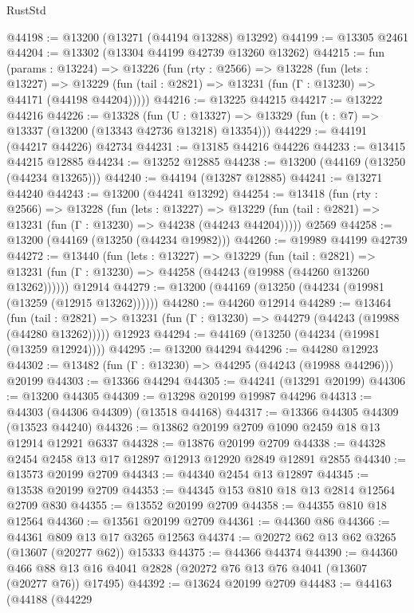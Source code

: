 \begin{lexlean}{RustStd}
\begin{coremodule}
@44198 := @13200 (@13271 (@44194 @13288) @13292)
@44199 := @13305 @2461
@44204 := @13302 (@13304 @44199 @42739 @13260 @13262)
@44215 := fun (params : @13224) =>
  @13226
    (fun (rty : @2566) =>
    @13228
      (fun (lets : @13227) =>
      @13229 (fun (tail : @2821) => @13231 (fun (Γ : @13230) => @44171 (@44198 @44204)))))
@44216 := @13225 @44215
@44217 := @13222 @44216
@44226 := @13328
    (fun (U : @13327) => @13329 (fun (t : @7) => @13337 (@13200 (@13343 @42736 @13218) @13354)))
@44229 := @44191 (@44217 @44226) @42734
@44231 := @13185 @44216 @44226
@44233 := @13415 @44215 @12885
@44234 := @13252 @12885
@44238 := @13200 (@44169 (@13250 (@44234 @13265)))
@44240 := @44194 (@13287 @12885)
@44241 := @13271 @44240
@44243 := @13200 (@44241 @13292)
@44254 := @13418
    (fun (rty : @2566) =>
    @13228
      (fun (lets : @13227) =>
      @13229 (fun (tail : @2821) => @13231 (fun (Γ : @13230) => @44238 (@44243 @44204)))))
    @2569
@44258 := @13200 (@44169 (@13250 (@44234 @19982)))
@44260 := @19989 @44199 @42739
@44272 := @13440
    (fun (lets : @13227) =>
    @13229
      (fun (tail : @2821) =>
      @13231 (fun (Γ : @13230) => @44258 (@44243 (@19988 (@44260 @13260 @13262))))))
    @12914
@44279 := @13200 (@44169 (@13250 (@44234 (@19981 (@13259 (@12915 @13262))))))
@44280 := @44260 @12914
@44289 := @13464
    (fun (tail : @2821) => @13231 (fun (Γ : @13230) => @44279 (@44243 (@19988 (@44280 @13262)))))
    @12923
@44294 := @44169 (@13250 (@44234 (@19981 (@13259 @12924))))
@44295 := @13200 @44294
@44296 := @44280 @12923
@44302 := @13482 (fun (Γ : @13230) => @44295 (@44243 (@19988 @44296))) @20199
@44303 := @13366 @44294
@44305 := @44241 (@13291 @20199)
@44306 := @13200 @44305
@44309 := @13298 @20199 @19987 @44296
@44313 := @44303 (@44306 @44309) (@13518 @44168)
@44317 := @13366 @44305 @44309 (@13523 @44240)
@44326 := @13862 @20199 @2709 @1090 @2459 @18 @13 @12914 @12921 @6337
@44328 := @13876 @20199 @2709
@44338 := @44328 @2454 @2458 @13 @17 @12897 @12913 @12920 @2849 @12891 @2855
@44340 := @13573 @20199 @2709
@44343 := @44340 @2454 @13 @12897
@44345 := @13538 @20199 @2709
@44353 := @44345 @153 @810 @18 @13 @2814 @12564 @2709 @830
@44355 := @13552 @20199 @2709
@44358 := @44355 @810 @18 @12564
@44360 := @13561 @20199 @2709
@44361 := @44360 @86
@44366 := @44361 @809 @13 @17 @3265 @12563
@44374 := @20272 @62 @13 @62 @3265 (@13607 (@20277 @62)) @15333
@44375 := @44366 @44374
@44390 := @44360
    @466
    @88
    @13
    @16
    @4041
    @2828
    (@20272 @76 @13 @76 @4041 (@13607 (@20277 @76)) @17495)
@44392 := @13624 @20199 @2709
@44483 := @44163
    (@44188
      (@44229

\end{coremodule}
\end{lexlean}

